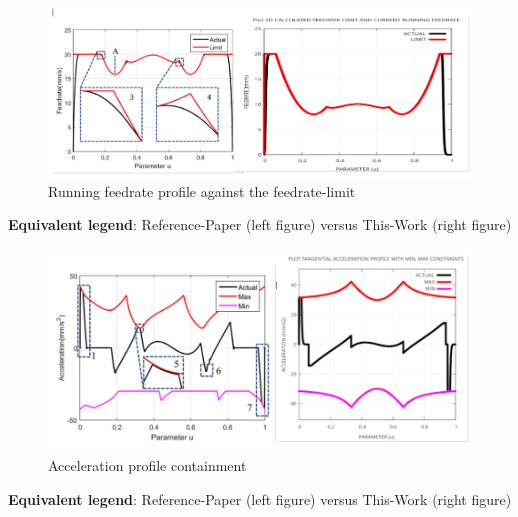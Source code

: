 \clearpage
\pagebreak
\begin{landscape} 
	
\begin{figure}
\centering
\caption  {Running feedrate profile against the feedrate-limit}
\label{img-Running feedrate profile against the feedrate-limit}
\includegraphics[width= 1.50\textwidth]{Chap4/Comparisons/03-Comparison-Running-feedrate-profile-against-the-feedrate-limit.png} 
\end{figure}		
	
\noindent
\textbf{Equivalent legend}: Reference-Paper (left figure) versus This-Work (right figure)\\


\end{landscape}

\clearpage
\pagebreak
\begin{landscape} 
	
\begin{figure}
\centering
\caption  {Acceleration profile containment}
\label{img-Acceleration profile containment}
\includegraphics[width= 1.30\textwidth]{Chap4/Comparisons/04-Comparison-Acceleration-profile-containment.png} 
\end{figure}		
	
\noindent
\textbf{Equivalent legend}: Reference-Paper (left figure) versus This-Work (right figure)\\


\end{landscape}
\clearpage
\pagebreak

